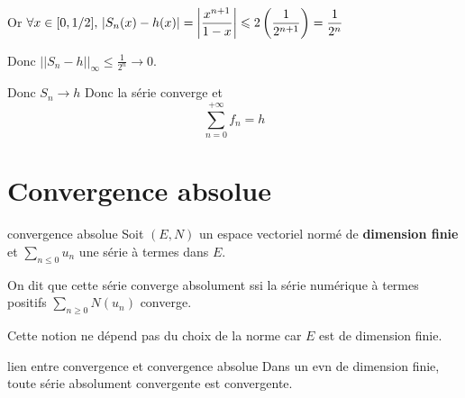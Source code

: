 Or $\displaystyle \forall x \in [0, 1 / 2], \, \left|S_n(x) - h(x)\right| = \left|\frac{x^{n + 1}}{1 - x}\right| \leqslant 2 \left( \frac 1 {2^{n + 1}} \right) = \frac 1 {2^n}$

Donc $|| S_n - h ||_\infty \leqslant \frac 1 {2^n} \longrightarrow 0$.

Donc $S_n \longrightarrow h$ Donc la série converge et 
$$\sum_{n = 0}^{+\infty} f_n = h$$


\section{Convergence absolue }

\begin{definition}{convergence absolue}{}
    Soit $(E, N)$ un espace vectoriel normé de \textbf{dimension finie} et $\sum_{n \leqslant 0} u_n$
    une série à termes dans $E$. 

    On dit que cette série converge absolument ssi la série numérique à termes positifs 
    $\sum_{n \geqslant 0} N(u_n)$ converge. 
\end{definition}


\begin{remarque}
    Cette notion ne dépend pas du choix de la norme car $E$ est de dimension finie.
\end{remarque}


\begin{theoreme}{lien entre convergence et convergence absolue}{}
    Dans un evn de dimension finie, toute série absolument convergente est convergente.
\end{theoreme}


